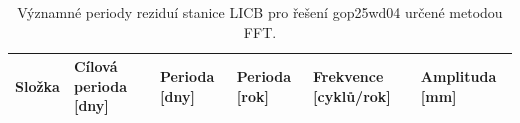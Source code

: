 \begin{table}[htbp]
\caption{Významné periody reziduí stanice LICB pro řešení gop25wd04 určené metodou FFT.}
\label{tab:gop25wd04_stcd_licb_detr_weighted_1seg_spectral_fft_significant_periods}
\begin{tabular}{llllll}
\toprule
Složka & Cílová perioda [dny] & Perioda [dny] & Perioda [rok] & Frekvence [cyklů/rok] & Amplituda [mm] \\
\midrule
\bottomrule
\end{tabular}
\end{table}
